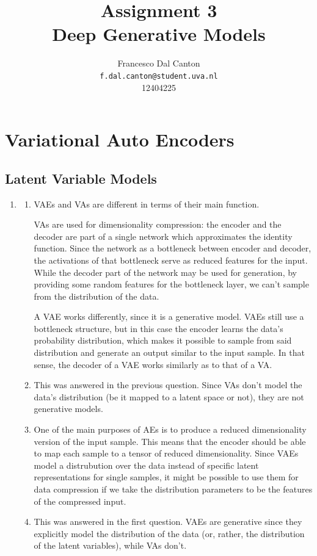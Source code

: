 \documentclass{article}
\title{\textbf{Assignment 3}\\Deep Generative Models}
\author{
  Francesco Dal Canton \\
  \texttt{f.dal.canton@student.uva.nl} \\
  12404225
}
\begin{document}
\maketitle

\section{Variational Auto Encoders}

\subsection{Latent Variable Models}

\begin{enumerate}[label=\textbf{1.\arabic*}]
  \item

  \begin{enumerate}[label=\arabic*.]
    \item
    VAEs and VAs are different in terms of their main function.

    VAs are used for dimensionality compression: the encoder and the decoder are part of a single network which approximates the identity function. Since the network as a bottleneck between encoder and decoder, the activations of that bottleneck serve as reduced features for the input. While the decoder part of the network may be used for generation, by providing some random features for the bottleneck layer, we can't sample from the distribution of the data.

    A VAE works differently, since it is a generative model. VAEs still use a bottleneck structure, but in this case the encoder learns the data's probability distribution, which makes it possible to sample from said distribution and generate an output similar to the input sample. In that sense, the decoder of a VAE works similarly as to that of a VA.

    \item
    This was answered in the previous question. Since VAs don't model the data's distribution (be it mapped to a latent space or not), they are not generative models.

    \item
    One of the main purposes of AEs is to produce a reduced dimensionality version of the input sample. This means that the encoder should be able to map each sample to a tensor of reduced dimensionality. Since VAEs model a distrubution over the data instead of specific latent representations for single samples, it might be possible to use them for data compression if we take the distribution parameters to be the features of the compressed input.

    \item
    This was answered in the first question. VAEs are generative since they explicitly model the distribution of the data (or, rather, the distribution of the latent variables), while VAs don't.

  \end{enumerate}
\end{enumerate}
\end{document}
